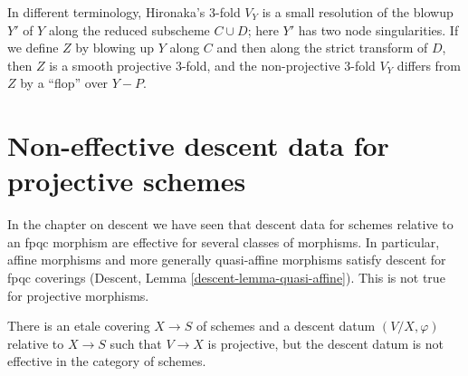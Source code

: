 \noindent
In different terminology, Hironaka's 3-fold $V_Y$ is a small
resolution of the blowup $Y'$ of $Y$ along the reduced subscheme
$C\cup D$; here $Y'$ has two node singularities. If we define $Z$ by blowing
up $Y$ along $C$ and then along the strict transform
of $D$, then $Z$ is a smooth projective 3-fold, and the non-projective
3-fold $V_Y$ differs from $Z$ by a ``flop'' over $Y-P$.


\section{Non-effective descent data for projective schemes}
\label{section-non-effective-descent-projective}

\noindent
In the chapter on descent we have seen that descent data for schemes relative
to an fpqc morphism are effective for several classes
of morphisms. In particular, affine morphisms and more generally
quasi-affine morphisms satisfy descent for fpqc coverings
(Descent, Lemma \ref{descent-lemma-quasi-affine}).
This is not true for projective morphisms.

\begin{lemma}
\label{lemma-non-effective-descent-projective}
There is an etale covering $X\to S$ of schemes and a descent datum
$(V/X,\varphi)$ relative to $X\to S$ such that 
$V\to X$ is projective,
but the descent datum is not effective in the category of schemes.
\end{lemma}

